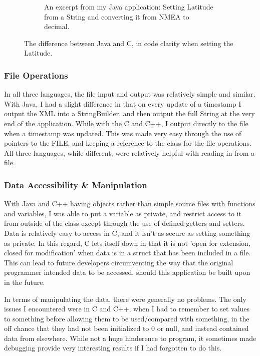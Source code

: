 \documentclass{article}
\begin{document}
\begin{figure}[H]
\begin{subfigure}[b]{0.5\textwidth}
                \caption{An excerpt from my Java application: Setting Latitude from a String and converting it from NMEA to decimal.}
                \label{fig:latjava}
        \end{subfigure}
        \caption{The difference between Java and C, in code clarity when setting the Latitude.}\label{fig:latitudediff}
\end{figure}

\subsubsection{File Operations}

In all three languages, the file input and output was relatively simple and similar. With Java, I had a slight difference in that on every update of a timestamp I output the XML into a StringBuilder, and then output the full String at the very end of the application. While with the C and C++, I output directly to the file when a timestamp was updated. This was made very easy through the use of pointers to the FILE, and keeping a reference to the class for the file operations. All three languages, while different, were relatively helpful with reading in from a file.


\subsubsection{Data Accessibility \& Manipulation}

With Java and C++ having objects rather than simple source files with functions and variables, I was able to put a variable as private, and restrict access to it from outside of the class except through the use of defined getters and setters. Data is relatively easy to access in C, and it isn't as secure as setting something as private. In this regard, C lets itself down in that it is not 'open for extension, closed for modification' when data is in a struct that has been included in a file. This can lead to future developers circumventing the way that the original programmer intended data to be accessed, should this application be built upon in the future.

In terms of manipulating the data, there were generally no problems. The only issues I encountered were in C and C++, when I had to remember to set values to something before allowing them to be used/compared with something, in the off chance that they had not been initialized to 0 or null, and instead contained data from elsewhere. While not a huge hinderence to program, it sometimes made debugging provide very interesting results if I had forgotten to do this.
\end{document}
